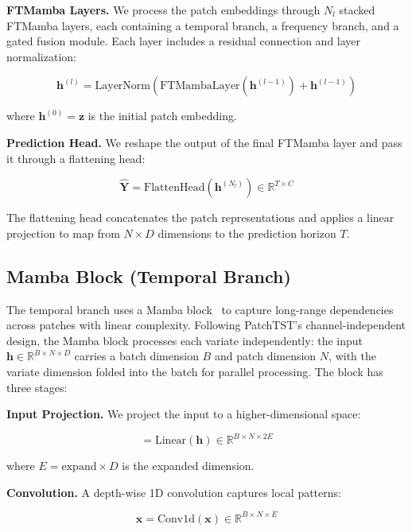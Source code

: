 \documentclass[electronics,article,submit,pdftex,moreauthors]{Definitions/mdpi}
\begin{document}
\textbf{FTMamba Layers.} We process the patch embeddings through $N_l$ stacked FTMamba layers, each containing a temporal branch, a frequency branch, and a gated fusion module. Each layer includes a residual connection and layer normalization:
\begin{linenomath}
\begin{equation}
\mathbf{h}^{(l)} = \text{LayerNorm}(\text{FTMambaLayer}(\mathbf{h}^{(l-1)}) + \mathbf{h}^{(l-1)})
\end{equation}
\end{linenomath}
where $\mathbf{h}^{(0)} = \mathbf{z}$ is the initial patch embedding.

\textbf{Prediction Head.} We reshape the output of the final FTMamba layer and pass it through a flattening head:
\begin{linenomath}
\begin{equation}
\hat{\mathbf{Y}} = \text{FlattenHead}(\mathbf{h}^{(N_l)}) \in \mathbb{R}^{T \times C}
\end{equation}
\end{linenomath}
The flattening head concatenates the patch representations and applies a linear projection to map from $N \times D$ dimensions to the prediction horizon $T$.

\subsection{Mamba Block (Temporal Branch)}

The temporal branch uses a Mamba block~\cite{ref10} to capture long-range dependencies across patches with linear complexity. Following PatchTST's channel-independent design, the Mamba block processes each variate independently: the input $\mathbf{h} \in \mathbb{R}^{B \times N \times D}$ carries a batch dimension $B$ and patch dimension $N$, with the variate dimension folded into the batch for parallel processing. The block has three stages:

\textbf{Input Projection.} We project the input to a higher-dimensional space:
\begin{linenomath}
\begin{equation}
[\mathbf{x}, \mathbf{res}] = \text{Linear}(\mathbf{h}) \in \mathbb{R}^{B \times N \times 2E}
\end{equation}
\end{linenomath}
where $E = \text{expand} \times D$ is the expanded dimension.

\textbf{Convolution.} A depth-wise 1D convolution captures local patterns:
\begin{linenomath}
\begin{equation}
\mathbf{x} = \text{Conv1d}(\mathbf{x}) \in \mathbb{R}^{B \times N \times E}
\end{equation}
\end{linenomath}
\end{document}
